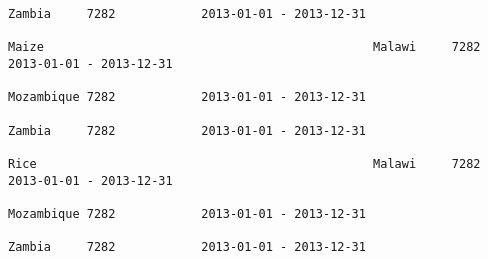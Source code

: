\documentclass[11pt]{article}
\begin{document}
\begin{Verbatim}[commandchars=\\\{\}]
                                                                                                                                                                                                                 Zambia     7282            2013-01-01 - 2013-12-31   
                                                                                                                                                              Maize                                              Malawi     7282            2013-01-01 - 2013-12-31   
                                                                                                                                                                                                                 Mozambique 7282            2013-01-01 - 2013-12-31   
                                                                                                                                                                                                                 Zambia     7282            2013-01-01 - 2013-12-31   
                                                                                                                                                              Rice                                               Malawi     7282            2013-01-01 - 2013-12-31   
                                                                                                                                                                                                                 Mozambique 7282            2013-01-01 - 2013-12-31   
                                                                                                                                                                                                                 Zambia     7282            2013-01-01 - 2013-12-31   
          

\end{Verbatim}
\end{document}
